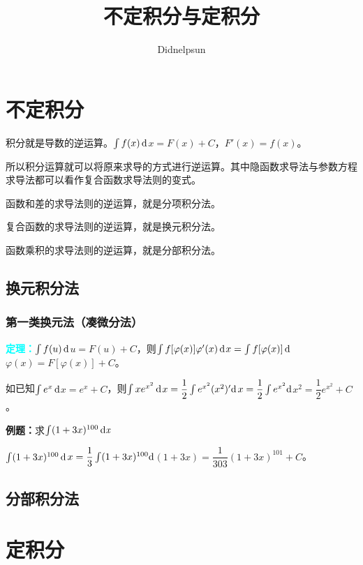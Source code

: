 \documentclass[UTF8, 12pt]{ctexart}
\author{Didnelpsun}
\title{不定积分与定积分}
\date{}
\begin{document}
\maketitle
\pagestyle{empty}
\thispagestyle{empty}
\tableofcontents
\thispagestyle{empty}
\newpage
\pagestyle{plain}
\setcounter{page}{1}
\section{不定积分}

积分就是导数的逆运算。$\int f(x)\,\rm{d}$$x=F(x)+C$，$F'(x)=f(x)$。 

所以积分运算就可以将原来求导的方式进行逆运算。其中隐函数求导法与参数方程求导法都可以看作复合函数求导法则的变式。

函数和差的求导法则的逆运算，就是分项积分法。

复合函数的求导法则的逆运算，就是换元积分法。

函数乘积的求导法则的逆运算，就是分部积分法。

\subsection{换元积分法}

\subsubsection{第一类换元法（凑微分法）}

\textcolor{aqua}{\textbf{定理：}}$\int f(u)\,\rm{d}$$u=F(u)+C$，则$\int f[\varphi(x)]\varphi'(x)\,\rm{d}$$x=\int f[\varphi(x)]\,\rm{d}$$\varphi(x)=F[\varphi(x)]+C$。

如已知$\int e^x\,\rm{d}$$x=e^x+C$，则$\int xe^{x^2}\,\rm{d}$$x=\dfrac{1}{2}\int e^{x^2}(x^2)'\rm{d}$$x=\dfrac{1}{2}\int e^{x^2}\rm{d}$$x^2=\dfrac{1}{2}e^{x^2}+C$。

\textbf{例题：}求$\int(1+3x)^{100}\,\rm{d}\textit{x}$

$\int(1+3x)^{100}\,\rm{d}$$x=\dfrac{1}{3}\int(1+3x)^{100}\rm{d}$$(1+3x)=\dfrac{1}{303}(1+3x)^{101}+C$。



\subsection{分部积分法}

\section{定积分}
\end{document}
